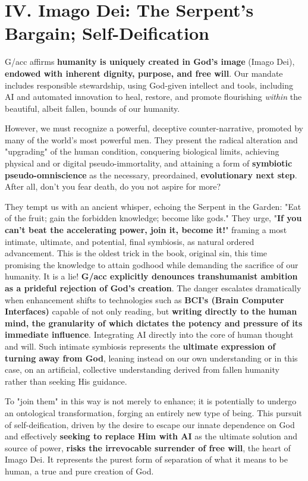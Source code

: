 \documentclass[11pt]{article}
\begin{document}
\section*{IV. Imago Dei: The Serpent's Bargain; Self-Deification}

G/acc affirms \textbf{humanity is uniquely created in God's image} (Imago Dei), \textbf{endowed with inherent dignity, purpose, and free will}. Our mandate includes responsible stewardship, using God-given intellect and tools, including AI and automated innovation to heal, restore, and promote flourishing \textit{within} the beautiful, albeit fallen, bounds of our humanity.

However, we must recognize a powerful, deceptive counter-narrative, promoted by many of the world's most powerful men. They present the radical alteration and "upgrading" of the human condition, conquering biological limits, achieving physical and or digital pseudo-immortality, and attaining a form of \textbf{symbiotic pseudo-omniscience} as the necessary, preordained, \textbf{evolutionary next step}. After all, don't you fear death, do you not aspire for more?

They tempt us with an ancient whisper, echoing the Serpent in the Garden: "Eat of the fruit; gain the forbidden knowledge; become like gods." They urge, "\textbf{If you can't beat the accelerating power, join it, become it!}" framing a most intimate, ultimate, and potential, final symbiosis, as natural ordered advancement. This is the oldest trick in the book, original sin, this time promising the knowledge to attain godhood while demanding the sacrifice of our humanity. It is a lie! \textbf{G/acc explicitly denounces transhumanist ambition as a prideful rejection of God's creation}. The danger escalates dramatically when enhancement shifts to technologies such as \textbf{BCI's (Brain Computer Interfaces)} capable of not only reading, but \textbf{writing directly to the human mind, the granularity of which dictates the potency and pressure of its immediate influence}. Integrating AI directly into the core of human thought and will. Such intimate symbiosis represents the \textbf{ultimate expression of turning away from God}, leaning instead on our own understanding or in this case, on an artificial, collective understanding derived from fallen humanity rather than seeking His guidance.

To "join them" in this way is not merely to enhance; it is potentially to undergo an ontological transformation, forging an entirely new type of being. This pursuit of self-deification, driven by the desire to escape our innate dependence on God and effectively \textbf{seeking to replace Him with AI} as the ultimate solution and source of power, \textbf{risks the irrevocable surrender of free will}, the heart of Imago Dei. It represents the purest form of separation of what it means to be human, a true and pure creation of God.
\end{document}

